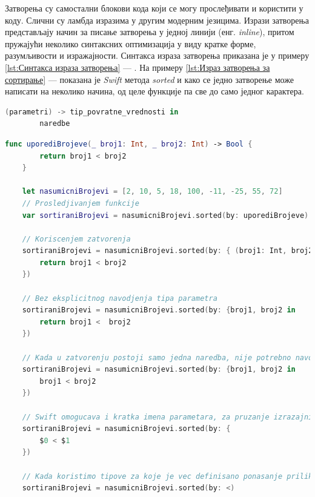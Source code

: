\documentclass[12pt,oneside]{memoir}
\begin{document}
\indent Затворења су самостални блокови кода који се могу прослеђивати и користити у коду. Слични су ламбда изразима у другим модерним језицима. Изрази затворења представљају начин за писање затворења у једној линији (енг. \textit{inline}), притом пружајући неколико синтаксних оптимизација у виду кратке форме, разумљивости и изражајности. Синтакса израза затворења приказана је у примеру \ref{lst:Синтакса израза затворења} --- . На примеру \ref{lst:Израз затворења за сортирање} ---  показана је \textit{Swift} метода \textit{sorted} и како се једно затворење може написати на неколико начина, од целе функције па све до само једног карактера.

\begin{lstlisting}[caption=\textit{{Синтакса израза затворења}}, label={lst:Синтакса израза затворења}, language=Swift, frame=single]
    (parametri) -> tip_povratne_vrednosti in
        naredbe
\end{lstlisting}

\begin{lstlisting}[caption=\textit{{Израз затворења за сортирање}}, label={lst:Израз затворења за сортирање}, language=Swift, frame=single]
    func uporediBrojeve(_ broj1: Int, _ broj2: Int) -> Bool {
        return broj1 < broj2
    }
    
    let nasumicniBrojevi = [2, 10, 5, 18, 100, -11, -25, 55, 72]
    // Prosledjivanjem funkcije
    var sortiraniBrojevi = nasumicniBrojevi.sorted(by: uporediBrojeve)
    
    // Koriscenjem zatvorenja
    sortiraniBrojevi = nasumicniBrojevi.sorted(by: { (broj1: Int, broj2: Int) -> Bool in
        return broj1 < broj2
    })
    
    // Bez eksplicitnog navodjenja tipa parametra
    sortiraniBrojevi = nasumicniBrojevi.sorted(by: {broj1, broj2 in 
        return broj1 <  broj2
    })
    
    // Kada u zatvorenju postoji samo jedna naredba, nije potrebno navodjenje kljucne reci return, povratna vrednost bice vrednost izvrsenja te naredbe
    sortiraniBrojevi = nasumicniBrojevi.sorted(by: {broj1, broj2 in 
        broj1 < broj2
    })
    
    // Swift omogucava i kratka imena parametara, za pruzanje izrazajnije sintakse
    sortiraniBrojevi = nasumicniBrojevi.sorted(by: { 
        $0 < $1
    })
    
    // Kada koristimo tipove za koje je vec definisano ponasanje prilikom poredjenja, mozemo proslediti samo kako zelimo da sortiramo clanove niza
    sortiraniBrojevi = nasumicniBrojevi.sorted(by: <)
\end{lstlisting}
\end{document}
